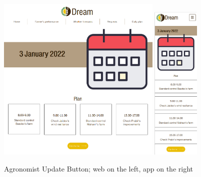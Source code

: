 \documentclass{article}
\begin{document}
        \begin{figure} [h]
            \centering
            \includegraphics[width=0.7\textwidth]{images/UserInterfaces/Agronomist/DailyPlan/UpdateButtonWeb.png}
            \quad
            \includegraphics[width=0.2\textwidth]{images/UserInterfaces/Agronomist/DailyPlan/UpdateButtonApp.png}
            \quad
            \caption{\label{fig:agronomistDPUpdateButton}Agronomist Update Button; web on the left, app on the right}
        \end{figure}
    
    
    \newpage
    
\end{document}
